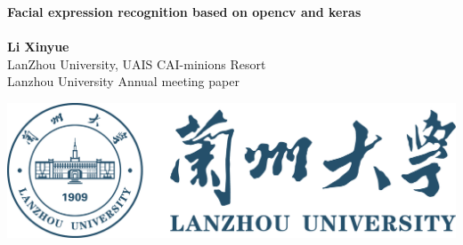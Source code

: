 \documentclass[a0,portrait]{a0poster}
\begin{document}


\begin{minipage}[b]{0.75\linewidth}
\Huge \color{NavyBlue} \textbf{Facial expression recognition based on opencv and keras} \color{Black}\\ %
\LARGE \textit{}\\[2cm] %
\LARGE \textbf{Li Xinyue}\\[0.5cm] %
\LARGE LanZhou University, UAIS CAI-minions Resort\\ [0.4cm] %
\large Lanzhou University Annual meeting paper 
\\
\end{minipage}
%
\hspace{-5.5cm}\begin{minipage}[b]{0.3\linewidth}
\includegraphics[scale=2.5]{lzu.png}
\end{minipage}

\vspace{1cm} %

\end{document}
